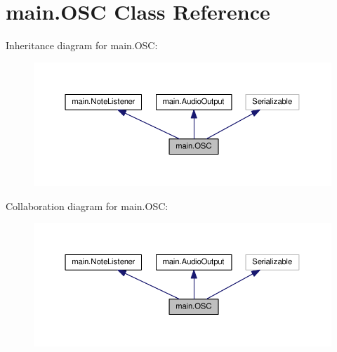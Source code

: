 \hypertarget{classmain_1_1_o_s_c}{}\section{main.\+O\+SC Class Reference}
\label{classmain_1_1_o_s_c}


Inheritance diagram for main.\+O\+SC\+:
\nopagebreak
\begin{figure}[H]
\begin{center}
\leavevmode
\includegraphics[width=350pt]{classmain_1_1_o_s_c__inherit__graph}
\end{center}
\end{figure}


Collaboration diagram for main.\+O\+SC\+:
\nopagebreak
\begin{figure}[H]
\begin{center}
\leavevmode
\includegraphics[width=350pt]{classmain_1_1_o_s_c__coll__graph}
\end{center}
\end{figure}
